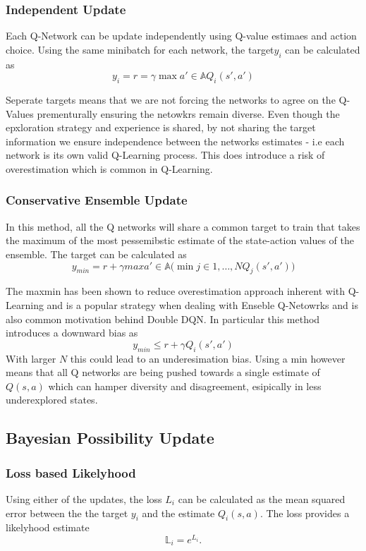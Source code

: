 \documentclass[12pt,a4paper]{report}
\begin{document}
\subsubsection{Independent Update}
Each Q-Network can be update independently using Q-value estimaes and action choice.  Using the same minibatch for each network, the target$y_i$ can be calculated as 
\[
  y_i = r = \gamma \max{a' \in \mathbb{A}}Q_i(s', a')
\]\par
Seperate targets means that we are not forcing the networks to agree on the Q-Values prementurally ensuring the netowkrs remain diverse. Even though the epxloration strategy and experience is shared, by not sharing the target information we ensure independence between the networks estimates - i.e each network is its own valid Q-Learning process. This does introduce a risk of overestimation which is common in Q-Learning. \par

\subsubsection{Conservative Ensemble Update}
In this method, all the Q networks will share a common target to train that takes the maximum of the most pessemibstic estimate of the state-action values of the ensemble. The target can be calculated as \[
  y_{min} = r + \gamma max{a' \in \mathbb{A}}\big(\min{j \in 1, \dots, N}Q_j(s', a')\big)
\]
\par 
The maxmin has been shown to reduce overestimation approach inherent with Q-Learning and is a popular strategy when dealing with Enseble Q-Netowrks \cite{lan2021maxminq} and is also common motivation behind Double DQN. In particular this method introduces a downward bias as 
\[
  y_{min} \le r + \gamma Q_i(s', a')
\]
With larger $N$ this could lead to an underesimation bias. Using a min however means that all Q networks are being pushed towards a single estimate of $Q(s,a)$ which can hamper diversity and disagreement, esipically in less underexplored states. 

\subsection{Bayesian Possibility Update}
\subsubsection{Loss based Likelyhood}
Using either of the updates, the loss $L_i$ can be calculated as the mean squared error between the the target $y_i$ and the estimate $Q_i(s,a)$. The loss provides a likelyhood estimate \[\mathbb{L}_i = e^{L_i}.\]
\end{document}
